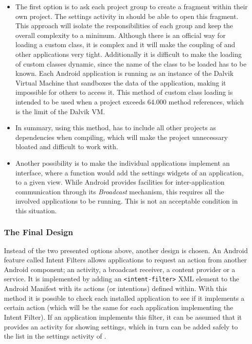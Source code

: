 \begin{itemize}
\item 
The first option is to ask each project group to create a fragment within their own project. 
The settings activity in \launcher should be able to open this fragment.
This approach will isolate the responsibilities of each group and keep the overall complexity to a minimum.
Although there is an official way for loading a custom class\cite{customClassLoading}, it is complex and it will make the coupling of \launcher and other applications very tight.
Additionally it is difficult to make the loading of custom classes dynamic, since the name of the class to be loaded has to be known.
Each Android application is running as an instance of the Dalvik Virtual Machine that sandboxes the data of the application, making it impossible for others to access it.
This method of custom class loading is intended to be used when a project exceeds 64.000 method references, which is the limit of the Dalvik VM.

\item
In summary, using this method, \launcher has to include all other projects as dependencies when compiling, which will make the \launcher project unnecessary bloated and difficult to work with.

\item
Another possibility is to make the individual applications implement an interface, where a function would add the settings widgets of an application, to a given view.
While Android provides facilities for inter-application communication through its \textit{Broadcast} mechanism\cite{broadcastReceiver}, this requires all the involved applications to be running.
This is not an acceptable condition in this situation. 
\end{itemize}
 
\subsubsection{The Final Design}
Instead of the two presented options above, another design is chosen.
An Android feature called Intent Filters allows applications to request an action from another Android component; an activity, a broadcast receiver, a content provider or a service.
It is implemented by adding an \lstinline|<intent-filter>| XML element to the Android Manifest with its actions (or intentions) defined within.\cite{intentFilter}
With this method it is possible to check each installed application to see if it implements a certain action (which will be the same for each \giraf application implementing the Intent Filter).
If an application implements this filter, it can be assumed that it provides an activity for showing settings, which in turn can be added safely to the list in the settings activity of \launcher.

